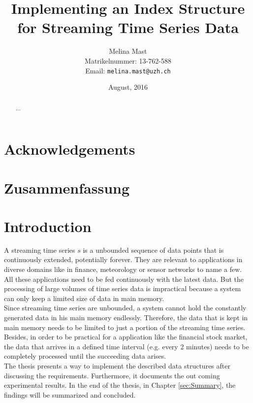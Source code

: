 \documentclass[abstracton,12pt]{scrreprt}
\title{Implementing an Index Structure for Streaming Time Series Data}
\author{
  Melina Mast\\[-5pt]
  \scriptsize Matrikelnummer: 13-762-588\\[-5pt]
  \scriptsize Email: \texttt{melina.mast@uzh.ch}
}
\date{\vspace*{2cm}August, 2016}
\begin{document}
\maketitle

\chapter*{Acknowledgements}



\begin{abstract}
  ...
\end{abstract}

\chapter*{Zusammenfassung}

\tableofcontents
\listoffigures
\listoftables
\renewcommand{\lstlistingname}{Algorithm}%

\listofalgorithms
{}

\chapter{Introduction}
A streaming time series \(s\) is a unbounded sequence of data points that is continuously extended, potentially forever. They are relevant to applications in diverse domains like in finance, meteorology or sensor networks to name a few. All these applications need to be fed continuously with the latest data. But the processing of large volumes of time series data is impractical because a system can only keep a limited size of data in main memory.\\
Since streaming time series are unbounded, a system cannot hold the constantly generated data in his main memory endlessly. Therefore, the data that is kept in main memory needs to be limited to just a portion of the streaming time series. Besides, in order to be practical for a application like the financial stock market, the data that arrives in a defined time interval (e.g. every 2 minutes) needs to be completely processed until the succeeding data arises.\\
The thesis presents a way to implement the described data structures after discussing the requirements. Furthermore, it documents the out coming experimental results.
In the end of the thesis, in Chapter \ref{sec:Summary}, the findings will be summarized and concluded.
\end{document}

